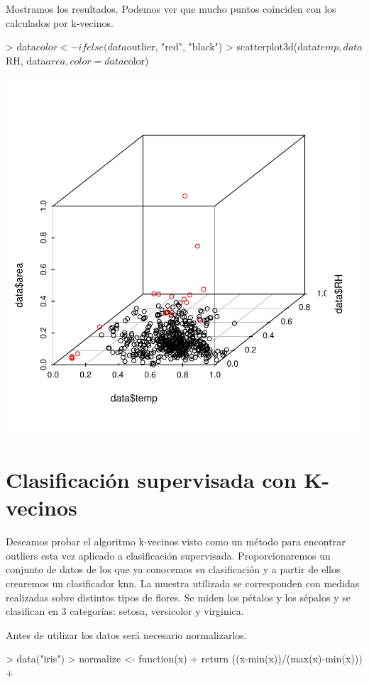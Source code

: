\documentclass [a4paper] {article}
\begin{document}
Mostramos los resultados.
Podemos ver que mucho puntos coinciden con los calculados por k-vecinos.
\begin{center}
\begin{Schunk}
\begin{Sinput}
> data$color <- ifelse(data$outlier, "red", "black")
> scatterplot3d(data$temp, data$RH, data$area,  color = data$color)
\end{Sinput}
\end{Schunk}
\includegraphics{entrega-mahalanobis_plot}
\end{center}

\newpage
\section{Clasificación supervisada con K-vecinos}
Deseamos probar el algoritmo k-vecinos visto como un método para encontrar outliers esta vez aplicado a clasificación supervisada.
Proporcionaremos un conjunto de datos de los que ya conocemos su clasificación y a partir de ellos crearemos un clasificador knn.
La muestra utilizada se corresponden con medidas realizadas sobre distintos tipos de flores.
Se miden los pétalos y los sépalos y se clasifican en 3 categorías: setosa, versicolor y virginica.

Antes de utilizar los datos será necesario normalizarlos.
\begin{Schunk}
\begin{Sinput}
> data("iris")
> normalize <- function(x){
+   return ((x-min(x))/(max(x)-min(x)))
+ }
\end{Sinput}
\end{Schunk}
\end{document}

